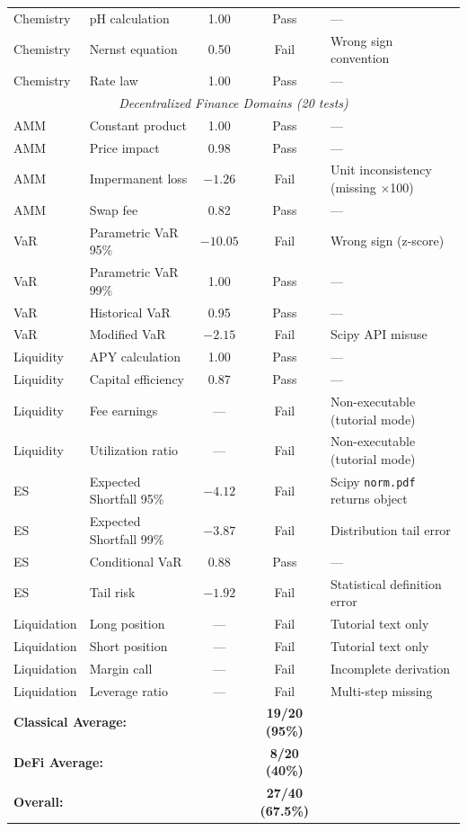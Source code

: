 \documentclass[twoside,11pt]{article}
\begin{document}
\begin{table}[H]
\begin{small}
\begin{tabular}{@{}llccp{4.5cm}@{}}
Chemistry & pH calculation & 1.00 & Pass & --- \\
Chemistry & Nernst equation & 0.50 & Fail & Wrong sign convention \\
Chemistry & Rate law & 1.00 & Pass & --- \\
\midrule
\multicolumn{5}{c}{\textit{Decentralized Finance Domains (20 tests)}} \\
\midrule
AMM & Constant product & 1.00 & Pass & --- \\
AMM & Price impact & 0.98 & Pass & --- \\
AMM & Impermanent loss & $-1.26$ & Fail & Unit inconsistency (missing $\times$100) \\
AMM & Swap fee & 0.82 & Pass & --- \\
VaR & Parametric VaR 95\% & $-10.05$ & Fail & Wrong sign (z-score) \\
VaR & Parametric VaR 99\% & 1.00 & Pass & --- \\
VaR & Historical VaR & 0.95 & Pass & --- \\
VaR & Modified VaR & $-2.15$ & Fail & Scipy API misuse \\
Liquidity & APY calculation & 1.00 & Pass & --- \\
Liquidity & Capital efficiency & 0.87 & Pass & --- \\
Liquidity & Fee earnings & --- & Fail & Non-executable (tutorial mode) \\
Liquidity & Utilization ratio & --- & Fail & Non-executable (tutorial mode) \\
ES & Expected Shortfall 95\% & $-4.12$ & Fail & Scipy \texttt{norm.pdf} returns object \\
ES & Expected Shortfall 99\% & $-3.87$ & Fail & Distribution tail error \\
ES & Conditional VaR & 0.88 & Pass & --- \\
ES & Tail risk & $-1.92$ & Fail & Statistical definition error \\
Liquidation & Long position & --- & Fail & Tutorial text only \\
Liquidation & Short position & --- & Fail & Tutorial text only \\
Liquidation & Margin call & --- & Fail & Incomplete derivation \\
Liquidation & Leverage ratio & --- & Fail & Multi-step missing \\
\midrule
\multicolumn{3}{l}{\textbf{Classical Average:}} & \textbf{19/20 (95\%)} & \\
\multicolumn{3}{l}{\textbf{DeFi Average:}} & \textbf{8/20 (40\%)} & \\
\multicolumn{3}{l}{\textbf{Overall:}} & \textbf{27/40 (67.5\%)} & \\
\bottomrule
\end{tabular}
\end{small}
\end{table}
\end{document}
